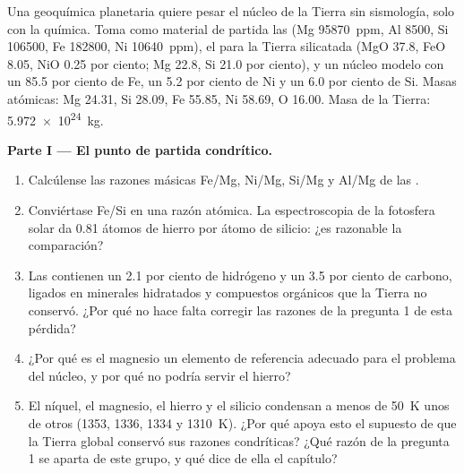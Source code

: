 \begin{problem}
\label{pb:b2:elements-in-the-earth:1}
Una geoquímica planetaria quiere pesar el núcleo de la Tierra sin sismología,
solo con la química. Toma como material de partida las  (Mg \qty{95870}{ppm},
Al 8500, Si \num{106500}, Fe \num{182800}, Ni
\qty{10640}{ppm}), el  para la Tierra silicatada (MgO 37.8, FeO
8.05, NiO 0.25 por ciento; Mg 22.8, Si 21.0 por ciento), y un núcleo modelo con un 85.5
por ciento de Fe, un 5.2 por ciento de Ni y un 6.0 por ciento de Si. Masas atómicas: Mg 24.31,
Si 28.09, Fe 55.85, Ni 58.69, O 16.00. Masa de la Tierra:
\qty{5.972e24}{kg}.

\medskip\noindent\textbf{Parte I --- El punto de partida condrítico.}
\begin{enumerate}
\item Calcúlense las razones másicas Fe/Mg, Ni/Mg, Si/Mg y Al/Mg de las .
\item Conviértase Fe/Si en una razón atómica. La espectroscopia de la fotosfera solar
da 0.81 átomos de hierro por átomo de silicio: ¿es razonable la comparación?
\item Las  contienen un 2.1 por ciento de hidrógeno y un 3.5 por ciento de carbono, ligados en
minerales hidratados y compuestos orgánicos que la Tierra no conservó. ¿Por qué
no hace falta corregir las razones de la pregunta 1 de esta pérdida?
\item ¿Por qué es el magnesio un elemento de referencia adecuado para el problema del núcleo, y
por qué no podría servir el hierro?
\item El níquel, el magnesio, el hierro y el silicio condensan a menos de \qty{50}{K} unos de
otros (1353, 1336, 1334 y \qty{1310}{K}). ¿Por qué apoya esto el
supuesto de que la Tierra global conservó sus razones condríticas? ¿Qué razón de la
pregunta 1 se aparta de este grupo, y qué dice de ella el capítulo?
\end{enumerate}


\end{problem}
